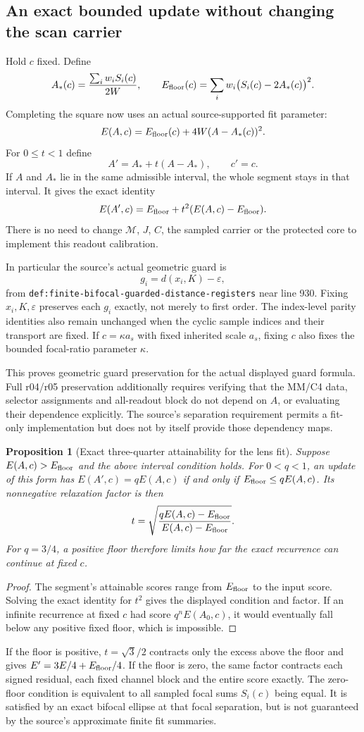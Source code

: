 \documentclass[11pt,a4paper]{article}
\newtheorem{proposition}{Proposition}
\begin{document}
\subsection{An exact bounded update without changing the scan carrier}
Hold $c$ fixed. Define
\[
 A_*(c)=\frac{\sum_iw_iS_i(c)}{2W},\qquad
 E_{\rm floor}(c)=\sum_iw_i\bigl(S_i(c)-2A_*(c)\bigr)^2.
\]
Completing the square now uses an actual source-supported fit parameter:
\[
 E(A,c)=E_{\rm floor}(c)+4W(A-A_*(c))^2.
\]
For $0\le t<1$ define
\[
 A'=A_*+t(A-A_*),\qquad c'=c.
\]
If $A$ and $A_*$ lie in the same admissible interval, the whole segment
stays in that interval. It gives the exact identity
\[
 E(A',c)=E_{\rm floor}+t^2(E(A,c)-E_{\rm floor}).
\]
There is no need to change $\mathcal M$, $J$, $C$, the sampled carrier
or the protected core to implement this readout calibration.

In particular the source's actual geometric guard is
\[
 g_i=d(x_i,K)-\varepsilon,
\]
from \texttt{def:finite-bifocal-guarded-distance-registers} near line 930.
Fixing $x_i,K,\varepsilon$ preserves each $g_i$ exactly, not merely to
first order. The index-level parity identities also remain unchanged
when the cyclic sample indices and their transport are fixed. If
$c=\kappa a_s$ with fixed inherited scale $a_s$, fixing $c$ also fixes
the bounded focal-ratio parameter $\kappa$.

This proves geometric guard preservation for the actual displayed
guard formula. Full r04/r05 preservation additionally requires verifying
that the MM/C4 data, selector assignments and all-readout block do not
depend on $A$, or evaluating their dependence explicitly. The source's
separation requirement permits a fit-only implementation but does not
by itself provide those dependency maps.

\begin{proposition}[Exact three-quarter attainability for the lens fit]
\label{prop:lens-quarter-attainability}
Suppose $E(A,c)>E_{\rm floor}$ and the above interval condition holds.
For $0<q<1$, an update of this form has $E(A',c)=qE(A,c)$ if and only if
$E_{\rm floor}\le qE(A,c)$. Its nonnegative relaxation factor is then
\[
 t=\sqrt{\frac{qE(A,c)-E_{\rm floor}}{E(A,c)-E_{\rm floor}}}.
\]
For $q=3/4$, a positive floor therefore limits how far the exact recurrence
can continue at fixed $c$.
\end{proposition}
\begin{proof}
The segment's attainable scores range from $E_{\rm floor}$ to the
input score. Solving the exact identity for $t^2$ gives the displayed
condition and factor. If an infinite recurrence at fixed $c$ had score
$q^nE(A_0,c)$, it would eventually fall below any positive fixed floor,
which is impossible.
\end{proof}
If the floor is positive, $t=\sqrt3/2$ contracts only the excess above
the floor and gives $E'=3E/4+E_{\rm floor}/4$. If the floor is zero, the
same factor contracts each signed residual, each fixed channel block
and the entire score exactly. The zero-floor condition is equivalent
to all sampled focal sums $S_i(c)$ being equal. It is satisfied by an
exact bifocal ellipse at that focal separation, but is not guaranteed by
the source's approximate finite fit summaries.
\end{document}
